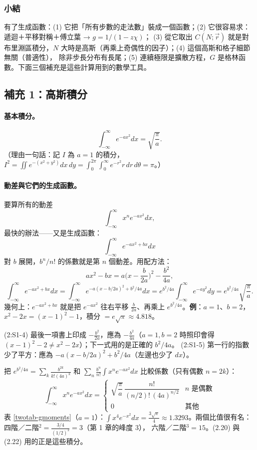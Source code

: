\subsubsection{小結}
有了生成函數：(1) 它把「所有步數的走法數」裝成一個函數；(2) 它很容易求：遞迴＋平移對稱＋傅立葉 → $g=1/(1-z\chi)$；
(3) 從它取出 $C(N;\vec r)$ 就是對布里淵區積分，$N$ 大時是高斯（再乘上奇偶性的因子）；(4) 這個高斯和格子細節無關（普適性），
除非步長分布有長尾；(5) 連續極限是擴散方程，$G$ 是格林函數。下面三個補充是這些計算用到的數學工具。

\subsection{補充 1：高斯積分}

\paragraph{基本積分。}
\[\int_{-\infty}^\infty e^{-ax^2}dx=\sqrt{\frac\pi a}.\tag{2:S1-1}\]
（理由一句話：記 $I$ 為 $a=1$ 的積分，$I^2=\iint e^{-(x^2+y^2)}dx\,dy=\int_0^{2\pi}\!\!\int_0^\infty e^{-r^2}r\,dr\,d\theta=\pi$。）

\paragraph{動差與它們的生成函數。}
要算所有的動差
\[\int_{-\infty}^\infty x^ne^{-ax^2}dx,\tag{2:S1-2}\]
最快的辦法——又是生成函數：
\[\int_{-\infty}^\infty e^{-ax^2+bx}dx\tag{2:S1-3}\]
對 $b$ 展開，$b^n/n!$ 的係數就是第 $n$ 個動差。用配方法：
\[ax^2-bx=a\Big(x-\frac b{2a}\Big)^2-\frac{b^2}{4a},\tag{2:S1-4}\]
\[\int_{-\infty}^\infty e^{-ax^2+bx}dx=\int_{-\infty}^\infty e^{-a(x-b/2a)^2+b^2/4a}dx=e^{b^2/4a}\int_{-\infty}^\infty e^{-ay^2}dy=e^{b^2/4a}\sqrt{\frac\pi a}.\tag{2:S1-5}\]
幾何上：$e^{-ax^2+bx}$ 就是把 $e^{-ax^2}$ 往右平移 $\frac b{2a}$、再乘上 $e^{b^2/4a}$。\textbf{例}：$a=1$、$b=2$，$x^2-2x=(x-1)^2-1$，積分 $=e\sqrt\pi\approx4.818$。
\begin{errbox}[p.~41--42，(2:S1-4)(2:S1-5)]
(2:S1-4) 最後一項書上印成 $-\frac{b^2}{2a}$，應為 $-\frac{b^2}{4a}$（$a=1,b=2$ 時照印會得 $(x-1)^2-2\ne x^2-2x$）；下一式用的是正確的 $b^2/4a$。
(2:S1-5) 第一行的指數少了平方：應為 $-a(x-b/2a)^2+b^2/4a$（左邊也少了 $dx$）。
\end{errbox}
把 $e^{b^2/4a}=\sum_k\frac{b^{2k}}{k!(4a)^k}$ 和 $\sum_n\frac{b^n}{n!}\int x^ne^{-ax^2}dx$ 比較係數（只有偶數 $n=2k$）：
\[\int_{-\infty}^\infty x^ne^{-ax^2}dx=\begin{cases}\sqrt{\dfrac\pi a}\,\dfrac{n!}{(n/2)!\,(4a)^{n/2}}&n\text{ 是偶數}\\[2mm]0&\text{其他}\end{cases}\tag{2:S1-6}\]
表 \ref{twotab-gmoments}（$a=1$）：$\int x^4e^{-x^2}dx=\frac{3\sqrt\pi}4\approx1.3293$。兩個比值很有名：四階／二階$^2=\frac{3/4}{(1/2)^2}=3$（第 1 章的峰度 3），
六階／二階$^3=15$。(2.20) 與 (2.22) 用的正是這些積分。
\begin{table}[H]
\centering
\caption{高斯的動差 $\int x^ne^{-x^2}dx$（公式 (2:S1-6) 與數值積分）}\label{twotab-gmoments}
\TwoTabMoments
\end{table}

